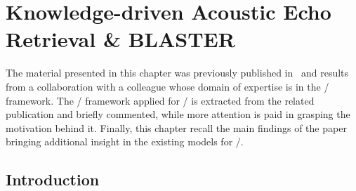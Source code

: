 \chapter{Knowledge-driven Acoustic Echo Retrieval \& \acs{BLASTER}}\label{ch:blaster}

 \synopsisChBlaster

\mynewline
The material presented in this chapter was previously published in~\cite{di2020blaster} and results from a collaboration with a colleague whose
domain of expertise is in the \CDdef/ framework.
The \CD/ framework applied for \AER/ is extracted from the related publication and briefly commented, while more attention is paid in grasping the motivation behind it.
Finally, this chapter recall the main findings of the paper bringing additional insight in the existing models for \AER/.

\section{Introduction}
\label{sec:blaster:intro}

